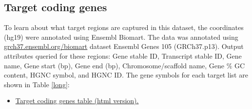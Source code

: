 \documentclass{article}
\begin{document}
\clearpage
\subsection{Target coding genes}
\label{coding}
To learn about what target regions are captured in this dataset, the coordinates (hg19) were annotated using Ensembl Biomart. The data was annotated using 
\href{http://grch37.ensembl.org/biomart/martview/3b67c8bb1f8be31e245e76a1b368fc8b}{grch37.ensembl.org/biomart}
dataset Ensembl Genes 105 (GRCh37.p13).
Output attributes queried for these regions: Gene stable ID, Transcript stable ID, Gene name, Gene start (bp), Gene end (bp), Chromosome/scaffold name, Gene \% GC content, HGNC symbol, and HGNC ID.
The gene symbols for each target list are shown in Table \ref{long}:
\begin{itemize}
	\item \href{https://lawlessgenomics.com/pages/sophia/target_info_biomart_simple.html}{Target coding genes table (html version).}
\end{itemize}
\end{document}
